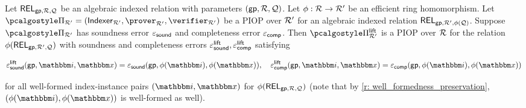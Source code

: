 \documentclass[11pt,letterpaper,usenames,dvipsnames]{article}
\begin{document}
  

    
        \begin{lemma}\label{l: lift_preserves_soundness}
        Let $\mathsf{REL}_{\mathsf{gp},\mathcal{R},\mathcal{Q}}$ be an algebraic indexed relation with parameters $(\mathsf{gp},\mathcal{R},\mathcal{Q})$. Let $\phi:\mathcal{R} \to \mathcal{R}'$ be an efficient ring homomorphism. Let $\prot_{\R'}=(\indexer_{\R'}, \prover_{\R'}, \verifier_{\R'})$ be a  PIOP over $\mathcal{R}'$ for an algebraic indexed relation $\mathsf{REL}_{\mathsf{gp},\mathcal{R}',\phi(\mathcal{Q})}$. Suppose $\prot_{\R'}$ has soundness error $\varepsilon_{\mathsf{sound}}$ and completeness error $\varepsilon_{\mathsf{comp}}$. Then  $\prot_{\R'}^\lift$ is a PIOP over $\mathcal{R}$ for the relation $\phi(\mathsf{REL}_{\mathsf{gp},\mathcal{R}', \mathcal{Q}})$ with soundness and completeness errors $\varepsilon_{\mathsf{sound}}^{\mathsf{lift}}, \varepsilon_{\mathsf{comp}}^{\mathsf{lift}}$ satisfying
        
            $$\eps_{\soundness}^\lift(\gparams, \idx,\inp) = \eps_{\soundness}(\gparams, \phi(\idx), \phi(\inp)), \quad \eps_{\completeness}^\lift(\gparams, \idx,\inp) = \eps_{\completeness}(\gparams, \phi(\idx), \phi(\inp))$$
        
        for all well-formed index-instance pairs $(\idx,\inp)$ for $\phi(\mathsf{REL}_{\mathsf{gp},\mathcal{R}, \mathcal{Q}})$ (note that by \cref{r: well_formedness_preservation}, $(\phi(\idx),\phi(\inp))$ is well-formed as well).
        \end{lemma}
\end{document}

